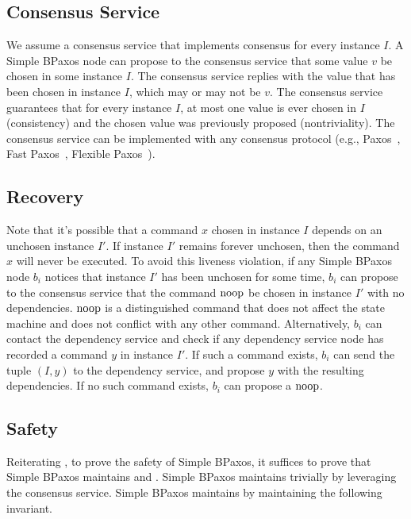 \subsection{Consensus Service}
We assume a consensus service that implements consensus for every instance $I$.
A Simple BPaxos node can propose to the consensus service that some value $v$
be chosen in some instance $I$. The consensus service replies with the value
that has been chosen in instance $I$, which may or may not be $v$. The
consensus service guarantees that for every instance $I$, at most one value is
ever chosen in $I$ (consistency) and the chosen value was previously proposed
(nontriviality). The consensus service can be implemented with any consensus
protocol (e.g., Paxos~\cite{lamport1998part, lamport2001paxos}, Fast
Paxos~\cite{lamport2006fast}, Flexible Paxos~\cite{howard2016flexible}).

\subsection{Recovery}
Note that it's possible that a command $x$ chosen in instance $I$ depends on an
unchosen instance $I'$. If instance $I'$ remains forever unchosen, then the
command $x$ will never be executed. To avoid this liveness violation, if any
Simple BPaxos node $b_i$ notices that instance $I'$ has been unchosen for some
time, $b_i$ can propose to the consensus service that the command $\text{noop}$ be
chosen in instance $I'$ with no dependencies. $\text{noop}$ is a distinguished
command that does not affect the state machine and does not conflict with any
other command.
%
Alternatively, $b_i$ can contact the dependency service and check if any
dependency service node has recorded a command $y$ in instance $I'$. If such a
command exists, $b_i$ can send the tuple $(I, y)$ to the dependency service,
and propose $y$ with the resulting dependencies. If no such command exists,
$b_i$ can propose a $\text{noop}$.

\subsection{Safety}
Reiterating , to prove the safety of Simple BPaxos, it
suffices to prove that Simple BPaxos maintains  and
.
%
Simple BPaxos maintains  trivially by leveraging the
consensus service. Simple BPaxos maintains  by
maintaining the following invariant.

